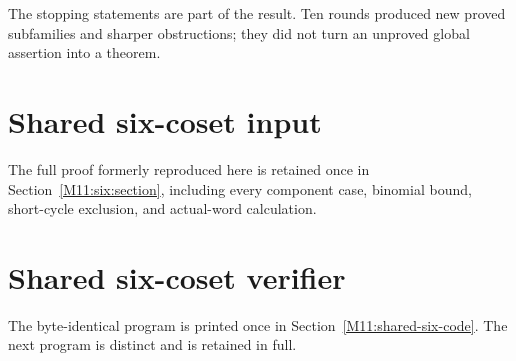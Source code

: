 \documentclass[11pt,a4paper,oneside]{report}
\theoremstyle{definition}
\theoremstyle{remark}
\begin{document}
The stopping statements are part of the result. Ten rounds produced
new proved subfamilies and sharper obstructions; they did not turn
an unproved global assertion into a theorem.


\clearpage


\section{Shared six-coset input}
The full proof formerly reproduced here is retained once in
Section~\ref{M11:six:section}, including every component case, binomial
bound, short-cycle exclusion, and actual-word calculation.
\section{Shared six-coset verifier}
The byte-identical program is printed once in
Section~\ref{M11:shared-six-code}. The next program is distinct and
is retained in full.
\end{document}
